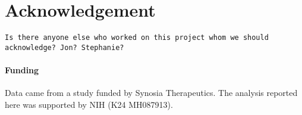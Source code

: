 \section*{Acknowledgement}
\verb|Is there anyone else who worked on this project whom we should acknowledge? Jon? Stephanie?|
\paragraph{Funding\textcolon} Data came from a study funded by Synosia Therapeutics. The analysis reported here was supported by NIH (K24 MH087913).
